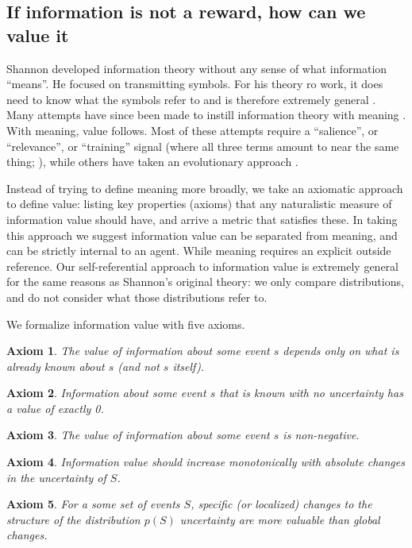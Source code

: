 \documentclass[9pt,twocolumn,twoside]{pnas-new}
\newtheorem{axiom}{Axiom}
\begin{document}
\subsection*{If information is not a reward, how can we value it}
Shannon developed information theory without any sense of what information ``means''. He focused on transmitting symbols. For his theory ro work, it does need to know what the symbols refer to and is therefore extremely general \citep{Shannon1948}. Many attempts have since been made to instill information theory with meaning \citep{Kolchinsky2018}. With meaning, value follows. Most of these attempts require a ``salience'', or ``relevance'', or ``training'' signal (where all three terms amount to near the same thing; \cite{Deacon2015,Tishby}), while others have taken an evolutionary approach \citep{Kolchinsky2018,Deacon2015}.  

Instead of trying to define meaning more broadly, we take an axiomatic approach to define value: listing key properties (axioms) that any naturalistic measure of information value should have, and arrive a metric that satisfies these. In taking this approach we suggest information value can be separated from meaning, and can be strictly internal to an agent. While meaning requires an explicit outside reference. Our self-referential approach to information value is extremely general for the same reasons as Shannon's original theory: we only compare distributions, and do not consider what those distributions refer to.

We formalize information value with five axioms.

\begin{axiom}
    The value of information about some event $s$ depends \textit{only} on what is already known about $s$ (and not $s$ itself).    
    \label{ax:1}
\end{axiom}
\begin{axiom}
    Information about some event $s$ that is known with no uncertainty has a value of exactly 0.
    \label{ax:2}
\end{axiom}
\begin{axiom}
    The value of information about some event $s$ is non-negative. 
    \label{ax:3}
\end{axiom}
\begin{axiom}
    Information value should increase monotonically with absolute changes in the uncertainty of $S$.
    \label{ax:4}
\end{axiom}
\begin{axiom}
    For a some set of events $S$, specific (or localized) changes to the structure of the distribution $p(S)$ uncertainty are more valuable than global changes.
    \label{ax:5}
\end{axiom}
\end{document}
